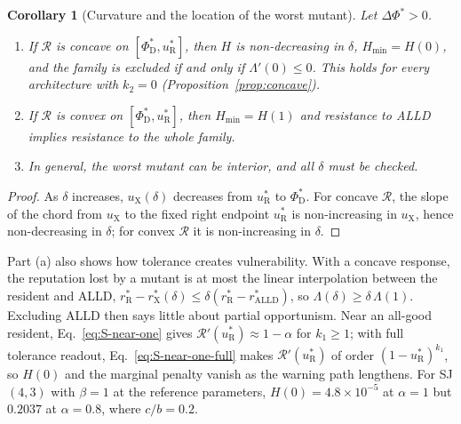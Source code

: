 \documentclass[fleqn,10pt]{article}
\theoremstyle{plain}
\newtheorem{corollary}[proposition]{Corollary}
\theoremstyle{remark}
\newcommand{\Rm}{\mathcal R}
\newcommand{\D}{\mathrm D}
\newcommand{\ALLD}{\mathrm{ALLD}}
\newcommand{\rR}{r^*_{\mathrm R}}
\newcommand{\uR}{u^*_{\mathrm R}}
\begin{document}
\begin{corollary}[Curvature and the location of the worst mutant]\label{cor:curvature}
Let $\Delta\Phi^*>0$.
\begin{enumerate}
\item[(a)] If $\Rm$ is concave on $[\Phi^*_\D,\uR]$, then $H$ is non-decreasing in
$\delta$, $H_{\min}=H(0)$, and the family is excluded if and only if
$\Lambda'(0)\le0$. This holds for every architecture with $k_2=0$
(Proposition~\ref{prop:concave}).
\item[(b)] If $\Rm$ is convex on $[\Phi^*_\D,\uR]$, then $H_{\min}=H(1)$ and
resistance to ALLD implies resistance to the whole family.
\item[(c)] In general, the worst mutant can be interior, and all $\delta$ must be
checked.
\end{enumerate}
\end{corollary}
\begin{proof}
As $\delta$ increases, $u_{\mathrm X}(\delta)$ decreases from $\uR$ to $\Phi^*_\D$.
For concave $\Rm$, the slope of the chord from $u_{\mathrm X}$ to the fixed right
endpoint $\uR$ is non-increasing in $u_{\mathrm X}$, hence non-decreasing in
$\delta$; for convex $\Rm$ it is non-increasing in $\delta$.
\end{proof}
Part (a) also shows how tolerance creates vulnerability. With a concave
response, the reputation lost by a mutant is at most the linear interpolation
between the resident and ALLD, $\rR-r^*_{\mathrm X}(\delta)\le\delta(\rR-r^*_{\ALLD})$,
so $\Lambda(\delta)\ge\delta\,\Lambda(1)$. Excluding ALLD then says little about
partial opportunism. Near an all-good resident, Eq.~\eqref{eq:S-near-one} gives
$\Rm'(\uR)\approx1-\alpha$ for $k_1\ge1$; with full tolerance readout,
Eq.~\eqref{eq:S-near-one-full} makes $\Rm'(\uR)$ of order $(1-\uR)^{k_1}$, so
$H(0)$ and the marginal penalty vanish as the warning path lengthens. For SJ
$(4,3)$ with $\beta=1$ at the reference parameters, $H(0)=4.8\times10^{-5}$ at
$\alpha=1$ but $0.2037$ at $\alpha=0.8$, where $c/b=0.2$.
\end{document}
